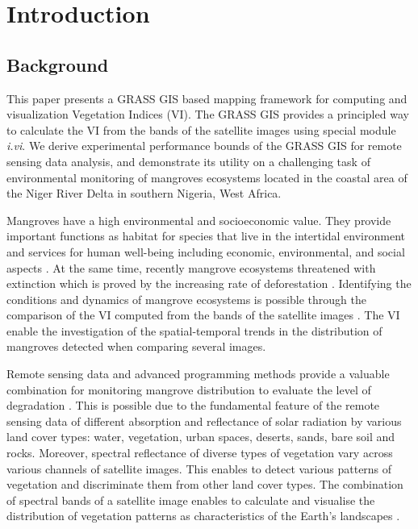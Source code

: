 \documentclass[jmse,article,submit,pdftex,moreauthors]{Definitions/mdpi}
\begin{document}
\section{Introduction}

\subsection{Background}

This paper presents a GRASS GIS based mapping framework for computing and visualization Vegetation Indices (VI). The GRASS GIS provides a principled way to calculate the VI from the bands of the satellite images using special module \emph{i.vi}. We derive experimental performance bounds of the GRASS GIS for remote sensing data analysis, and demonstrate its utility on a challenging task of environmental monitoring of mangroves ecosystems located in the coastal area of the Niger River Delta in southern Nigeria, West Africa.

Mangroves have a high environmental and socioeconomic value. They provide important functions as habitat for species that live in the intertidal environment \cite{James} and services for human well-being including economic, environmental, and social aspects \cite{AKANNI2018387}. At the same time, recently mangrove ecosystems threatened with extinction which is proved by the increasing rate of deforestation \cite{Enaruvbe2016,Numbere2021,Osuji,Fasona}. Identifying the conditions and dynamics of mangrove ecosystems is possible through the comparison of the VI computed from the bands of the satellite images \cite{HATI2022,ALATORRE201698,SATHISH2021102054}. The VI enable the investigation of the spatial-temporal trends in the distribution of mangroves detected when comparing several images.

Remote sensing data and advanced programming methods provide a valuable combination for monitoring mangrove distribution to evaluate the level of degradation \cite{Hu}. This is possible due to the fundamental feature of the remote sensing data of different absorption and reflectance of solar radiation by various land cover types: water, vegetation, urban spaces, deserts, sands, bare soil and rocks. Moreover, spectral reflectance of diverse types of vegetation vary across various channels of satellite images. This enables to detect various patterns of vegetation and discriminate them from other land cover types. The combination of spectral bands of a satellite image enables to calculate and visualise the distribution of vegetation patterns as characteristics of the Earth's landscapes \cite{CHOPADE2023118839,GITAU2023102898,MISHRA2021107486}.
\end{document}
